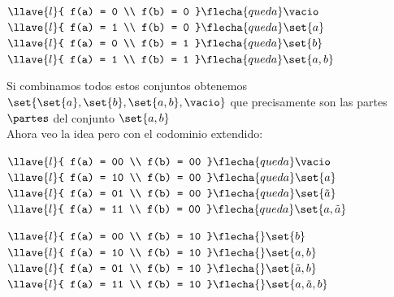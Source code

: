\begin{enumerate}[label=\alph*)]
        $
          \llave{l}{
            f(a) = 0 \\
            f(b) = 0
          }
          \flecha{queda}
          \vacio
          \quad$
        $
          \llave{l}{
            f(a) = 1 \\
            f(b) = 0
          }
          \flecha{queda}
          \set{a}
          \quad$
        $
          \llave{l}{
            f(a) = 0 \\
            f(b) = 1
          }
          \flecha{queda}
          \set{b}
          \quad$
        $
          \llave{l}{
            f(a) = 1 \\
            f(b) = 1
          }
          \flecha{queda}
          \set{a,b}
          \quad$ \par
        Si combinamos todos estos conjuntos obtenemos $\set{\set{a},\set{b},\set{a,b},\vacio}$ que precisamente son
        las partes $\partes$ del conjunto $\set{a,b}$ \\
        Ahora veo la idea pero con el codominio extendido: \par\smallskip
        $
          \llave{l}{
            f(a) = 00 \\
            f(b) = 00
          }
          \flecha{queda}
          \vacio
          \hspace{0.75em}$
        $
          \llave{l}{
            f(a) = 10 \\
            f(b) = 00
          }
          \flecha{queda}
          \set{a}
          \hspace{0.75em}$
        $
          \llave{l}{
            f(a) = 01 \\
            f(b) = 00
          }
          \flecha{queda}
          \set{\tilde{a}}
          \hspace{0.75em}$
        $
          \llave{l}{
            f(a) = 11 \\
            f(b) = 00
          }
          \flecha{queda}
          \set{a,\tilde{a}}
          \hspace{0.75em}$ \par
        $
          \llave{l}{
            f(a) = 00 \\
            f(b) = 10
          }
          \flecha{}
          \set{b}
          \hspace{0.75em}$
        $
          \llave{l}{
            f(a) = 10 \\
            f(b) = 10
          }
          \flecha{}
          \set{a,b}
          \hspace{0.75em}$
        $
          \llave{l}{
            f(a) = 01 \\
            f(b) = 10
          }
          \flecha{}
          \set{\tilde{a},b}
          \hspace{0.75em}$
        $
          \llave{l}{
            f(a) = 11 \\
            f(b) = 10
          }
          \flecha{}
          \set{a,\tilde{a},b}
          \hspace{0.75em}$


\end{enumerate}
